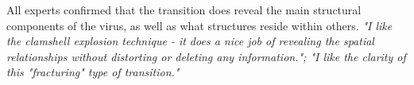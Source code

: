 









All experts confirmed that the transition does reveal the main structural components of the virus, as well as what structures reside within others. %
\textit{"I like the clamshell explosion technique - it does a nice job of revealing the spatial relationships without distorting or deleting any information."; "I like the clarity of this "fracturing" type of transition."}

